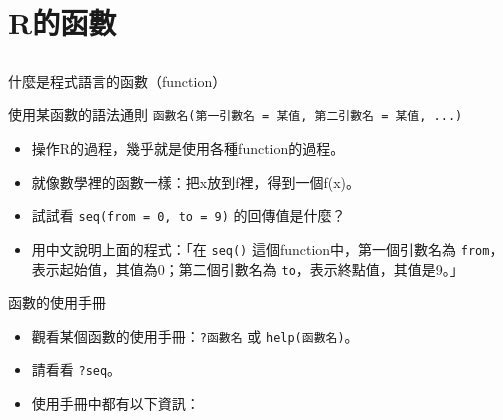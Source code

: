 \documentclass[12pt, aspectratio=43]{beamer}
\begin{document}

\section{R的函數}\subsection{}

\begin{frame}[fragile]{什麼是程式語言的函數（function）}

\begin{block}{使用某函數的語法通則}
\verb+函數名(第一引數名 = 某值, 第二引數名 = 某值, ...)+ 
\end{block}

\begin{itemize}
\item 操作R的過程，幾乎就是使用各種function的過程。
\item 就像數學裡的函數一樣：把x放到f裡，得到一個f(x)。
\item 試試看 \verb+seq(from = 0, to = 9)+ 的回傳值是什麼？
\item 用中文說明上面的程式：「在 \verb+seq()+ 這個function中，第一個引數名為 \verb+from+，表示起始值，其值為0；第二個引數名為 \verb+to+，表示終點值，其值是9。」
\end{itemize}
\end{frame}



\begin{frame}[fragile]{函數的使用手冊}
\begin{itemize}
\item 觀看某個函數的使用手冊：\verb+?函數名+ 或 \verb+help(函數名)+。
\item 請看看 \verb+?seq+。
\item 使用手冊中都有以下資訊：
\end{itemize}
\end{frame}
\end{document}
